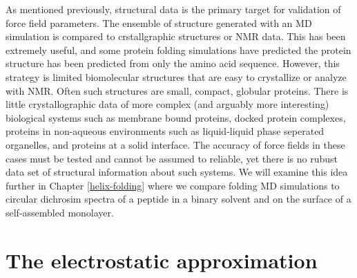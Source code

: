 As mentioned previously, structural data is the primary target for validation of force field parameters. 
The ensemble of structure generated with an MD simulation is compared to crstallgraphic structures or NMR data. 
This has been extremely useful, and some protein folding simulations have predicted the protein structure has been predicted from only the amino acid sequence. 
However, this strategy is limited biomolecular structures that are easy to crystallize or analyze with NMR.
Often such structures are small, compact, globular proteins. 
There is little crystallographic data of more complex (and arguably more interesting) biological systems such as membrane bound proteins, docked protein complexes, proteins in non-aqueous environments such as liquid-liquid phase seperated organelles, and proteins at a solid interface. 
The accuracy of force fields in these cases must be tested and cannot be assumed to reliable, yet there is no rubust data set of structural information about such systems. 
We will examine this idea further in Chapter \ref{helix-folding} where we compare folding MD simulations to circular dichrosim spectra of a peptide in a binary solvent and on the surface of a self-assembled monolayer. 

\section{The electrostatic approximation}

